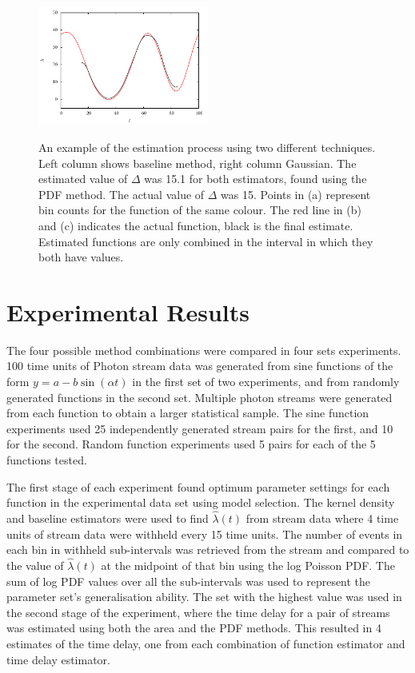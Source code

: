 \documentclass[11pt]{article}
\begin{document}
\begin{figure}[]
{   \includegraphics[width=0.5\textwidth]{images/comb_gauss}
   }

   \caption{An example of the estimation process using two different
   techniques. Left column shows baseline method, right column Gaussian. The
   estimated value of $\Delta$ was 15.1 for both estimators, found using the PDF
   method. The actual value of $\Delta$ was 15. Points in (a) represent bin
   counts for the function of the same colour. The red line in (b) and (c)
   indicates the actual function, black is the final estimate. Estimated
   functions are only combined in the interval in which they both have values.}

   \label{fig:finest}
   \end{figure}
\section{Experimental Results}
\label{sec-5}

  The four possible method combinations were compared in four sets
  experiments. 100 time units of Photon stream data was generated from sine
  functions of the form $y=a-b\sin(\alpha t)$ in the first set of two
  experiments, and from randomly generated functions in the second set. Multiple
  photon streams were generated from each function to obtain a larger
  statistical sample. The sine function experiments used 25 independently
  generated stream pairs for the first, and 10 for the second. Random function
  experiments used 5 pairs for each of the 5 functions tested.

  The first stage of each experiment found optimum parameter settings for each
  function in the experimental data set using model selection. The kernel
  density and baseline estimators were used to find $\hat{\lambda}(t)$ from
  stream data where 4 time units of stream data were withheld every 15 time
  units. The number of events in each bin in withheld sub-intervals was
  retrieved from the stream and compared to the value of $\hat{\lambda}(t)$ at
  the midpoint of that bin using the log Poisson PDF. The sum of log PDF values
  over all the sub-intervals was used to represent the parameter set's
  generalisation ability. The set with the highest value was used in the second
  stage of the experiment, where the time delay for a pair of streams was
  estimated using both the area and the PDF methods. This resulted in 4
  estimates of the time delay, one from each combination of function estimator
  and time delay estimator.
\end{document}
